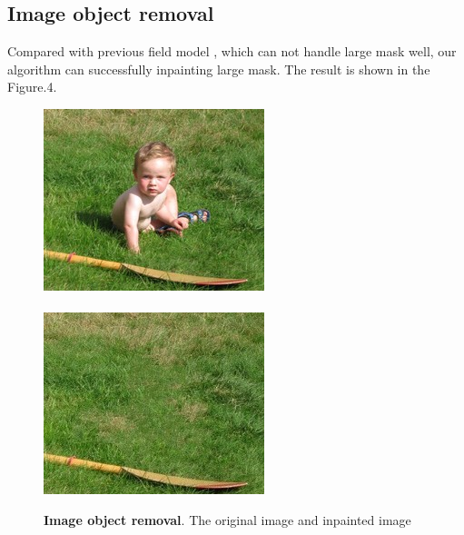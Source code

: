 \subsection*{Image object removal}
Compared with previous field model \cite{cvpr10mrf, ijcv09}, which can not handle large mask well, our algorithm can successfully inpainting large mask. The result is shown in the Figure.4. 
\begin{figure}
	\centering
	\includegraphics[width=0.9\linewidth]{kid.jpg}\\\ \\
	\includegraphics[width=0.9\linewidth]{kid_result.jpg}
	\caption{\textbf{Image object removal}. The original image and inpainted image}
\end{figure}

